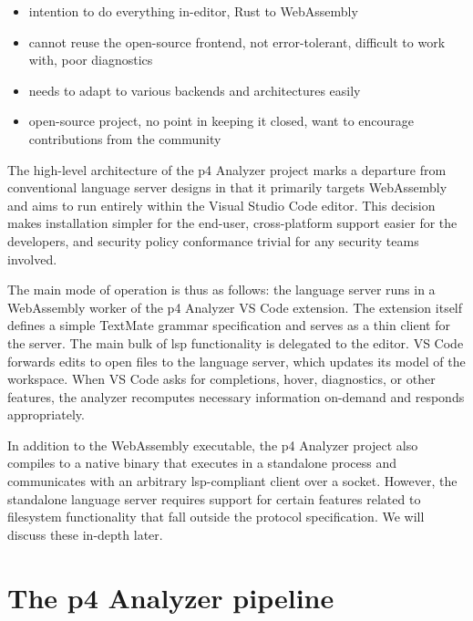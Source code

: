
\begin{itemize}
	\item intention to do everything in-editor, Rust to WebAssembly
	\item cannot reuse the open-source frontend, not error-tolerant, difficult
	to work with, poor diagnostics
	\item needs to adapt to various backends and architectures easily
	\item open-source project, no point in keeping it closed, want to encourage
	contributions from the community
\end{itemize}

The high-level architecture of the \acrshort{p4} Analyzer project marks a
departure from conventional language server designs in that it primarily targets
WebAssembly and aims to run entirely within the Visual Studio Code editor. This
decision makes installation simpler for the end-user, cross-platform support
easier for the developers, and security policy conformance trivial for any
security teams involved.

The main mode of operation is thus as follows: the language server runs in a
WebAssembly worker of the \acrshort{p4} Analyzer VS Code extension. The
extension itself defines a simple TextMate grammar specification
and serves as a thin client for the server. The main bulk of \acrshort{lsp}
functionality is delegated to the editor. VS Code forwards edits to open files
to the language server, which updates its model of the workspace. When VS Code
asks for completions, hover, diagnostics, or other features, the analyzer
recomputes necessary information on-demand and responds appropriately.

In addition to the WebAssembly executable, the \acrshort{p4} Analyzer project
also compiles to a native binary that executes in a standalone process and
communicates with an arbitrary \acrshort{lsp}-compliant client over a socket.
However, the standalone language server requires support for certain features
related to filesystem functionality that fall outside the protocol
specification. We will discuss these in-depth later.

\section{The \acrshort{p4} Analyzer pipeline}

